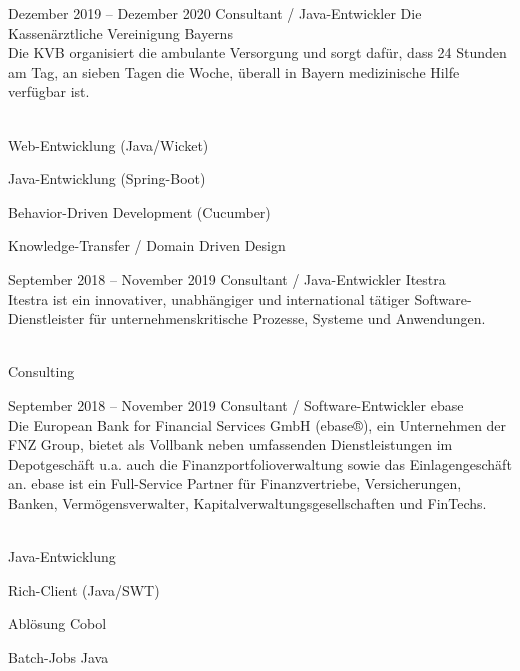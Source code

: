 \documentclass[fontsize=10pt]{tccv}
\begin{document}
\begin{eventlist}
\item{Dezember 2019 -- Dezember 2020}
     {Consultant / Java-Entwickler}
     {Die Kassenärztliche Vereinigung Bayerns}
\\
Die KVB organisiert die ambulante Versorgung und sorgt dafür, dass 24 Stunden
am Tag, an sieben Tagen die Woche, überall in Bayern medizinische Hilfe
verfügbar ist.
\\\\
\begin{assignments}
\item{Web-Entwicklung (Java/Wicket)}
\item{Java-Entwicklung (Spring-Boot)}
\item{Behavior-Driven Development (Cucumber)}
\item{Knowledge-Transfer / Domain Driven Design}
\end{assignments}

\item{September 2018 -- November 2019}
     {Consultant / Java-Entwickler}
     {Itestra}
\\
Itestra ist ein innovativer, unabhängiger und international tätiger
Software-Dienstleister für unternehmenskritische Prozesse, Systeme und
Anwendungen.
\\\\
\begin{assignments}
\item{Consulting}
\end{assignments}


\item{September 2018 -- November 2019}
     {Consultant / Software-Entwickler}
     {ebase}
\\
Die European Bank for Financial Services GmbH (ebase®), ein Unternehmen der FNZ
Group, bietet als Vollbank neben umfassenden Dienstleistungen im
Depotgeschäft u.a. auch die Finanzportfolioverwaltung sowie das
Einlagengeschäft an. ebase ist ein Full-Service Partner für
Finanzvertriebe, Versicherungen, Banken, Vermögensverwalter,
Kapitalverwaltungsgesellschaften und FinTechs.
\\\\
\begin{assignments}
\item{Java-Entwicklung}
\item{Rich-Client (Java/SWT)}
\item{Ablösung Cobol}
\item{Batch-Jobs Java}
\end{assignments}


\end{eventlist}
\end{document}
